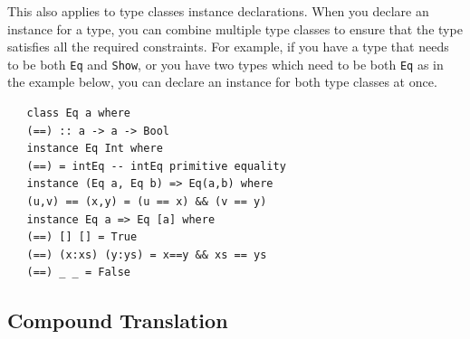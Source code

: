 This also applies to type classes instance declarations.
When you declare an instance for a type, you can combine multiple type classes to ensure that the type satisfies all the required constraints. For example, if you have a type that needs to be both \lstinline|Eq| and \lstinline|Show|, or you have two types which need to be both \lstinline|Eq| as in the example below, you can declare an instance for both type classes at once.
\begin{lstlisting}
   class Eq a where
   (==) :: a -> a -> Bool
   instance Eq Int where
   (==) = intEq -- intEq primitive equality
   instance (Eq a, Eq b) => Eq(a,b) where
   (u,v) == (x,y) = (u == x) && (v == y)
   instance Eq a => Eq [a] where
   (==) [] [] = True
   (==) (x:xs) (y:ys) = x==y && xs == ys
   (==) _ _ = False
\end{lstlisting}

\subsection{Compound Translation}
\newpage
